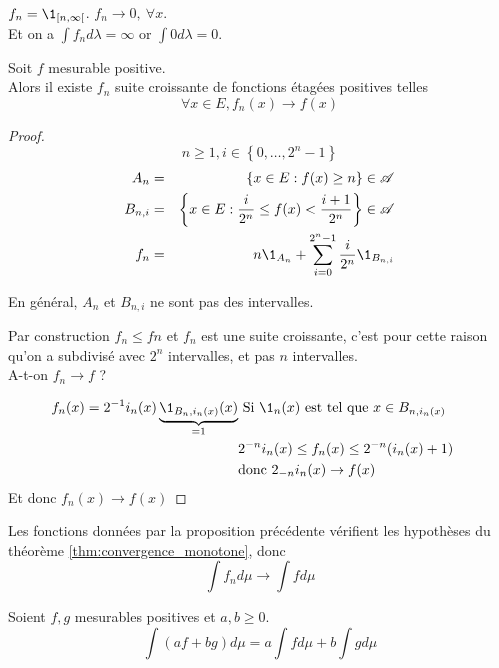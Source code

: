 \begin{example}
	$f_n = \1_{[n, \infty[}$. $f_n \to 0, \ \forall x $.\\
	Et on a  $\int f_n d\lambda = \infty$ or $\int 0 d\lambda = 0$.
\end{example}

\begin{prop}
	Soit $f$ mesurable positive.\\
	Alors il existe $f_n$ suite croissante de fonctions étagées positives telles
	$$\forall x \in E, f_n(x) \to f(x)$$
\end{prop}


\begin{proof} %
	$$n \geq 1, i \in \left\{0, \dots, 2^n - 1\right\}$$
	\begin{eqnarray*}
		A_{n} &=& \left\{ x \in E : f(x) \geq n \right\} \in \triA \\
		B_{n,i} &=& \left\{ x \in E : \frac{i}{2^n} \leq f(x) < \frac{i+1}{2^n} \right\} \in \triA \\
		f_n & = & n \1_{A_n} + \sum_{i=0}^{2^n - 1} \frac{i}{2^n} \1_{B_{n,i}}
	\end{eqnarray*}

	En général, $A_n$ et $B_{n,i}$ ne sont pas des intervalles.

	Par construction $f_n \leq fn$ et $f_n$ est une suite croissante, c'est pour cette raison qu'on a subdivisé avec $2^n$ intervalles, et pas $n$ intervalles.\\
	A-t-on $f_n \to f$ ?

	\begin{eqnarray*}
		f_n(x) =  2^{-1} i_n(x)\underbrace{\1_{B_n,i_n(x)}(x)}_{=1} &\text{ Si } \1_n(x) \text{ est tel que } x \in B_{n,i_n(x)} & \\
		& 2^{-n}i_n(x) \leq f_n(x) \leq 2^{-n}(i_n(x) + 1) &\\
		& \text{donc } 2_{-n}i_n(x) \to f(x) &
	\end{eqnarray*}
	Et donc $f_n(x) \to f(x)$
\end{proof}

\begin{remarque}
	Les fonctions données par la proposition précédente vérifient les hypothèses du théorème \ref{thm:convergence_monotone}, donc
	$$ \int f_n d\mu \to \int f d\mu $$
\end{remarque}


\begin{prop}[Linéarité]
	Soient $f,g$ mesurables positives et $a, b\geq 0$.
	$$ \int (af + bg) d\mu = a\int f d\mu + b\int g d\mu $$
\end{prop}


